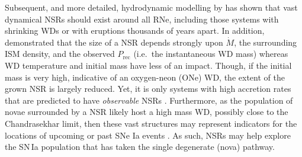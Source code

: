 \documentclass[fleqn,usenatbib]{mnras}
\begin{document}
Subsequent, and more detailed, hydrodynamic modelling by \citet{2023MNRAS.521.3004H} has shown that vast dynamical NSRs should exist around all RNe, including those systems with shrinking WDs or with eruptions thousands of years apart. In addition, \citet{2023MNRAS.521.3004H} demonstrated that the size of a NSR depends strongly upon $\dot{M}$, the surrounding ISM density, and the observed $P_\mathrm{rec}$ (i.e.\ the instantaneous WD mass) whereas WD temperature and initial mass have less of an impact. Though, if the initial mass is very high, indicative of an oxygen-neon (ONe) WD, the extent of the grown NSR is largely reduced. Yet, it is only systems with high accretion rates that are predicted to have {\it observable} NSRs \citep{2023MNRAS.521.3004H}. Furthermore, as the population of novae surrounded by a NSR likely host a high mass WD, possibly close to the Chandrasekhar limit, then these vast structures may represent indicators for the locations of upcoming or past SNe Ia events \citep{2021gacv.workE..44D}. As such, NSRs may help explore the SN\,Ia population that has taken the single degenerate (nova) pathway.
\end{document}

